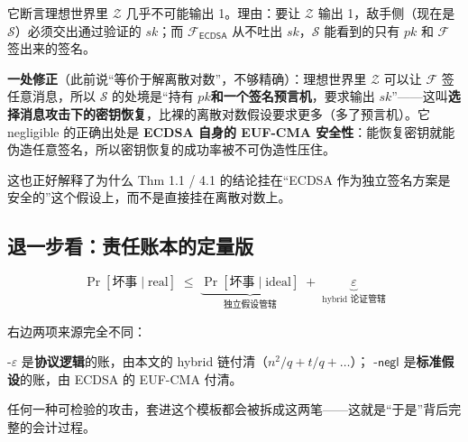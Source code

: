 它断言理想世界里 $\mathcal{Z}$ 几乎不可能输出
1。理由：要让 $\mathcal{Z}$ 输出
1，敌手侧（现在是 $\mathcal{S}$）必须交出通过验证的 $sk$；而 $\mathcal{F}_{\mathsf{ECDSA}}$ 从不吐出 $sk$，$\mathcal{S}$ 能看到的只有 $pk$ 和 $\mathcal{F}$ 签出来的签名。

\textbf{一处修正}（此前说“等价于解离散对数”，不够精确）：理想世界里 $\mathcal{Z}$ 可以让 $\mathcal{F}$ 签任意消息，所以 $\mathcal{S}$ 的处境是“持有 $pk$\textbf{和一个签名预言机}，要求输出 $sk$”------这叫\textbf{选择消息攻击下的密钥恢复}，比裸的离散对数假设要求更多（多了预言机）。它
negligible 的正确出处是 \textbf{ECDSA 自身的 EUF-CMA
安全性}：能恢复密钥就能伪造任意签名，所以密钥恢复的成功率被不可伪造性压住。

这也正好解释了为什么 Thm 1.1 / 4.1 的结论挂在“ECDSA
作为独立签名方案是安全的”这个假设上，而不是直接挂在离散对数上。

\subsection{退一步看：责任账本的定量版}

\[
\Pr[\text{坏事} \mid \text{real}]
\;\le\;
\underbrace{\Pr[\text{坏事} \mid \text{ideal}]}_{\text{独立假设管辖}}
\;+\;
\underbrace{\varepsilon}_{\text{hybrid 论证管辖}}
\]

右边两项来源完全不同：

-$\varepsilon$ 是\textbf{协议逻辑}的账，由本文的 hybrid
链付清（$n^2/q + t/q + \dots$）；
-$\mathsf{negl}$ 是\textbf{标准假设}的账，由 ECDSA 的 EUF-CMA 付清。

任何一种可检验的攻击，套进这个模板都会被拆成这两笔------这就是“于是”背后完整的会计过程。
